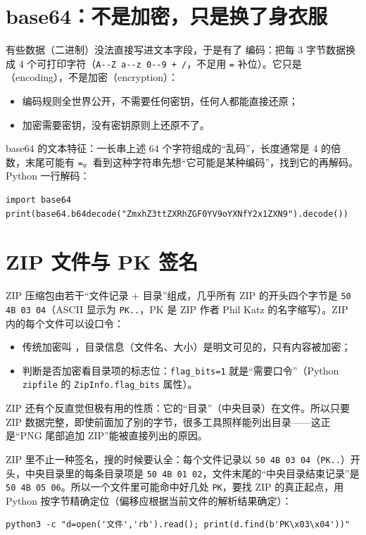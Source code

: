 \documentclass[UTF8,12pt,oneside]{ctexbook}
\begin{document}
\section{base64：不是加密，只是换了身衣服}
有些数据（二进制）没法直接写进文本字段，于是有了  编码：把每 3 字节数据换成 4 个可打印字符（\verb|A--Z a--z 0--9 + /|，不足用 \verb|=| 补位）。它只是（encoding），不是加密（encryption）：
\begin{itemize}
\item 编码规则全世界公开，不需要任何密钥，任何人都能直接还原；
\item 加密需要密钥，没有密钥原则上还原不了。
\end{itemize}
base64 的文本特征：一长串上述 64 个字符组成的“乱码”，长度通常是 4 的倍数，末尾可能有 \verb|=|。看到这种字符串先想“它可能是某种编码”，找到它的再解码。Python 一行解码：
\begin{lstlisting}
import base64
print(base64.b64decode("ZmxhZ3ttZXRhZGF0YV9oYXNfY2x1ZXN9").decode())
\end{lstlisting}

\section{ZIP 文件与 PK 签名}
ZIP 压缩包由若干“文件记录 + 目录”组成，几乎所有 ZIP 的开头四个字节是 \verb|50 4B 03 04|（ASCII 显示为 \verb|PK..|，PK 是 ZIP 作者 Phil Katz 的名字缩写）。ZIP 内的每个文件可以设口令：
\begin{itemize}
\item 传统加密叫 ，目录信息（文件名、大小）是明文可见的，只有内容被加密；
\item 判断是否加密看目录项的标志位：\verb|flag_bits=1| 就是“需要口令”（Python \verb|zipfile| 的 \verb|ZipInfo.flag_bits| 属性）。
\end{itemize}
ZIP 还有个反直觉但极有用的性质：它的“目录”（中央目录）在文件。所以只要 ZIP 数据完整，即使前面加了别的字节，很多工具照样能列出目录——这正是“PNG 尾部追加 ZIP”能被直接列出的原因。

ZIP 里不止一种签名，搜的时候要认全：每个文件记录以 \verb|50 4B 03 04|（\verb|PK..|）开头，中央目录里的每条目录项是 \verb|50 4B 01 02|，文件末尾的“中央目录结束记录”是 \verb|50 4B 05 06|。所以一个文件里可能命中好几处 \verb|PK|，要找 ZIP 的真正起点，用 Python 按字节精确定位（偏移应根据当前文件的解析结果确定）：
\begin{lstlisting}
python3 -c "d=open('文件','rb').read(); print(d.find(b'PK\x03\x04'))"
\end{lstlisting}
\end{document}
